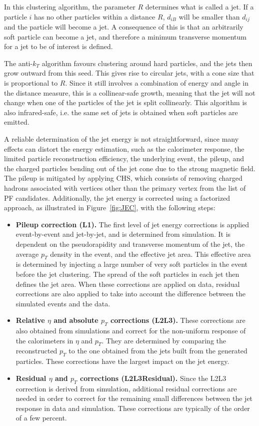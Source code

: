 In this clustering algorithm, the parameter $R$ determines what is called a jet. If a particle $i$ has no other particles within a distance $R$, $d_{iB}$ will be smaller than $d_{ij}$ and the particle will become a jet. A consequence of this is that an arbitrarily soft particle can become a jet, and therefore a minimum transverse momentum for a jet to be of interest is defined.

The anti-$k_T$ algorithm favours clustering around hard particles, and the jets then grow outward from this seed. This gives rise to circular jets, with a cone size that is proportional to $R$. Since it still involves a combination of energy and angle in the distance measure, this is a collinear-safe growth, meaning that the jet will not change when one of the particles of the jet is split collinearly. This algorithm is also infrared-safe, i.e. the same set of jets is obtained when soft particles are emitted.

A reliable determination of the jet energy is not straightforward, since many effects can distort the energy estimation, such as the calorimeter response, the limited particle reconstruction efficiency, the underlying event, the pileup, and the charged particles bending out of the jet cone due to the strong magnetic field. The pileup is mitigated by applying \ac{CHS}, which consists of removing charged hadrons associated with vertices other than the primary vertex from the list of \ac{PF} candidates. Additionally, the jet energy is corrected using a factorized approach, as illustrated in Figure~\ref{fig:JEC}, with the following steps:
\begin{itemize}
 \item \textbf{Pileup correction (L1).} The first level of jet energy corrections is applied event-by-event and jet-by-jet, and is determined from simulation. It is dependent on the pseudorapidity and transverse momentum of the jet, the average $p_T$ density in the event, and the effective jet area. This effective area is determined by injecting a large number of very soft particles in the event before the jet clustering. The spread of the soft particles in each jet then defines the jet area. When these corrections are applied on data, residual corrections are also applied to take into account the difference between the simulated events and the data.
 
 \item \textbf{Relative $\eta$ and absolute $p_T$ corrections (L2L3).} These corrections are also obtained from simulations and correct for the non-uniform response of the calorimeters in $\eta$ and $p_T$. They are determined by comparing the reconstructed $p_T$ to the one obtained from the jets built from the generated particles. These corrections have the largest impact on the jet energy.
 
 \item \textbf{Residual $\eta$ and $p_T$ corrections (L2L3Residual).} Since the L2L3 correction is derived from simulation, additional residual corrections are needed in order to correct for the remaining small differences between the jet response in data and simulation. These corrections are typically of the order of a few percent.
\end{itemize}

